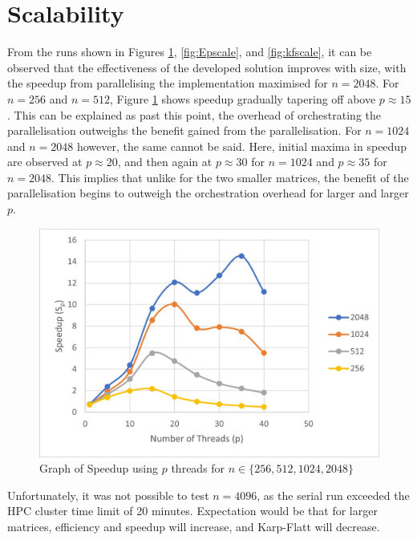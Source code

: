 \section{Scalability} \label{section:scalability}

From the runs shown in Figures \ref{fig:Spscale}, \ref{fig:Epscale}, and \ref{fig:kfscale}, it can be observed that the effectiveness of the developed solution improves with size, with the speedup from parallelising the implementation maximised for $n=2048$. For $n=256$ and $n=512$, Figure \ref{fig:Spscale} shows speedup gradually tapering off above $p\approx15$. This can be explained as past this point, the overhead of orchestrating the parallelisation outweighs the benefit gained from the parallelisation. For $n=1024$ and $n=2048$ however, the same cannot be said. Here, initial maxima in speedup are observed at $p\approx20$, and then again at $p\approx30$ for $n=1024$ and $p\approx35$ for $n=2048$. This implies that unlike for the two smaller matrices, the benefit of the parallelisation begins to outweigh the orchestration overhead for larger and larger $p$. 

\begin{figure}[H]
    \centering
    \includegraphics{Spscale}
    \caption{Graph of Speedup using $p$ threads for $n\in\{256, 512, 1024, 2048\}$}
    \label{fig:Spscale}
\end{figure}

Unfortunately, it was not possible to test $n=4096$, as the serial run exceeded the HPC cluster time limit of 20 minutes. Expectation would be that for larger matrices, efficiency and speedup will increase, and Karp-Flatt will decrease.

